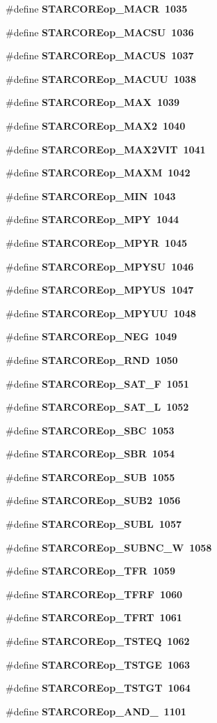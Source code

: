 \begin{CompactItemize}
\#define \bf{STARCOREop\_\-MACR}~1035
\item 
\#define \bf{STARCOREop\_\-MACSU}~1036
\item 
\#define \bf{STARCOREop\_\-MACUS}~1037
\item 
\#define \bf{STARCOREop\_\-MACUU}~1038
\item 
\#define \bf{STARCOREop\_\-MAX}~1039
\item 
\#define \bf{STARCOREop\_\-MAX2}~1040
\item 
\#define \bf{STARCOREop\_\-MAX2VIT}~1041
\item 
\#define \bf{STARCOREop\_\-MAXM}~1042
\item 
\#define \bf{STARCOREop\_\-MIN}~1043
\item 
\#define \bf{STARCOREop\_\-MPY}~1044
\item 
\#define \bf{STARCOREop\_\-MPYR}~1045
\item 
\#define \bf{STARCOREop\_\-MPYSU}~1046
\item 
\#define \bf{STARCOREop\_\-MPYUS}~1047
\item 
\#define \bf{STARCOREop\_\-MPYUU}~1048
\item 
\#define \bf{STARCOREop\_\-NEG}~1049
\item 
\#define \bf{STARCOREop\_\-RND}~1050
\item 
\#define \bf{STARCOREop\_\-SAT\_\-F}~1051
\item 
\#define \bf{STARCOREop\_\-SAT\_\-L}~1052
\item 
\#define \bf{STARCOREop\_\-SBC}~1053
\item 
\#define \bf{STARCOREop\_\-SBR}~1054
\item 
\#define \bf{STARCOREop\_\-SUB}~1055
\item 
\#define \bf{STARCOREop\_\-SUB2}~1056
\item 
\#define \bf{STARCOREop\_\-SUBL}~1057
\item 
\#define \bf{STARCOREop\_\-SUBNC\_\-W}~1058
\item 
\#define \bf{STARCOREop\_\-TFR}~1059
\item 
\#define \bf{STARCOREop\_\-TFRF}~1060
\item 
\#define \bf{STARCOREop\_\-TFRT}~1061
\item 
\#define \bf{STARCOREop\_\-TSTEQ}~1062
\item 
\#define \bf{STARCOREop\_\-TSTGE}~1063
\item 
\#define \bf{STARCOREop\_\-TSTGT}~1064
\item 
\#define \bf{STARCOREop\_\-AND\_}~1101

\end{CompactItemize}
